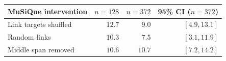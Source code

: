 \begin{tabular}{@{}lrrr@{}}
\toprule
MuSiQue intervention & $n{=}128$ & $n{=}372$ & 95\% CI ($n{=}372$) \\
\midrule
Link targets shuffled & $12.7$ & $9.0$ & $[4.9,13.1]$ \\
Random links & $10.3$ & $7.5$ & $[3.1,11.9]$ \\
Middle span removed & $10.6$ & $10.7$ & $[7.2,14.2]$ \\
\bottomrule
\end{tabular}
